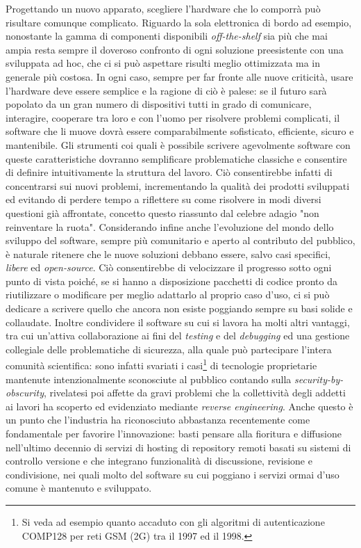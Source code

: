 Progettando un nuovo apparato, scegliere l'hardware che lo comporrà può risultare comunque complicato. Riguardo la sola elettronica di bordo ad esempio, nonostante la gamma di componenti disponibili \emph{off-the-shelf} sia più che mai ampia resta sempre il doveroso confronto di ogni soluzione preesistente con una sviluppata ad hoc, che ci si può aspettare risulti meglio ottimizzata ma in generale più costosa. In ogni caso, sempre per far fronte alle nuove criticità, usare l'hardware deve essere semplice e la ragione di ciò è palese: se il futuro sarà popolato da un gran numero di dispositivi tutti in grado di comunicare, interagire, cooperare tra loro e con l'uomo per risolvere problemi complicati, il software che li muove dovrà essere comparabilmente sofisticato, efficiente, sicuro e mantenibile. Gli strumenti coi quali è possibile scrivere agevolmente software con queste caratteristiche dovranno semplificare problematiche classiche e consentire di definire intuitivamente la struttura del lavoro. Ciò consentirebbe infatti di concentrarsi sui nuovi problemi, incrementando la qualità dei prodotti sviluppati ed evitando di perdere tempo a riflettere su come risolvere in modi diversi questioni già affrontate, concetto questo riassunto dal celebre adagio "non reinventare la ruota".\newpage
Considerando infine anche l'evoluzione del mondo dello sviluppo del software, sempre più comunitario e aperto al contributo del pubblico, è naturale ritenere che le nuove soluzioni debbano essere, salvo casi specifici, \emph{libere} ed \emph{open-source}. Ciò consentirebbe di velocizzare il progresso sotto ogni punto di vista poiché, se si hanno a disposizione pacchetti di codice pronto da riutilizzare o modificare per meglio adattarlo al proprio caso d'uso, ci si può dedicare a scrivere quello che ancora non esiste poggiando sempre su basi solide e collaudate. Inoltre condividere il software su cui si lavora ha molti altri vantaggi, tra cui un'attiva collaborazione ai fini del \emph{testing} e del \emph{debugging} ed una gestione collegiale delle problematiche di sicurezza, alla quale può partecipare l'intera comunità scientifica: sono infatti svariati i casi\footnote{Si veda ad esempio quanto accaduto con gli algoritmi di autenticazione COMP128 per reti GSM (2G) tra il 1997 ed il 1998.} di tecnologie proprietarie mantenute intenzionalmente sconosciute al pubblico contando sulla \emph{security-by-obscurity}, rivelatesi poi affette da gravi problemi che la collettività degli addetti ai lavori ha scoperto ed evidenziato mediante \emph{reverse engineering}. Anche questo è un punto che l'industria ha riconosciuto abbastanza recentemente come fondamentale per favorire l'innovazione: basti pensare alla fioritura e diffusione nell'ultimo decennio di servizi di hosting di repository remoti basati su sistemi di controllo versione e che integrano funzionalità di discussione, revisione e condivisione, nei quali molto del software su cui poggiano i servizi ormai d'uso comune è mantenuto e sviluppato.\\
